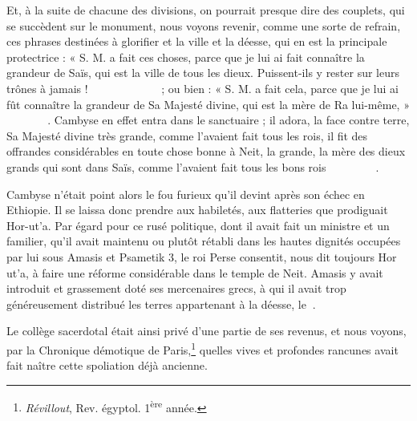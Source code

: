 \documentclass[letterpaper,twocolumn,openany,nodeprecatedcode]{dndbook}
\newcommand*\hieroAAAH{}
\newcommand*\hieroAAAO{}
\newcommand*\hieroAAAW{\raisebox{0.5ex}{}}
\newcommand*\hieroAAAX{}
\newcommand*\hieroAABC{\raisebox{0.5ex}{}}
\newcommand*\hieroAABR{}
\newcommand*\hieroAACB{\raisebox{0.5ex}{}}
\newcommand*\hieroAACM{}
\newcommand*\hieroAACN{\raisebox{1ex}{}}
\newcommand*\hieroAACS{}
\newcommand*\hieroAACW{}
\newcommand*\hieroAADS{}
\newcommand*\hieroAAEC{}
\newcommand*\hieroAAEK{}
\newcommand*\hieroAAFH{}
\newcommand*\hieroAAFN{\raisebox{0.5ex}{}}
\newcommand*\hieroAAHC{}
\newcommand*\hieroAAHW{}
\newcommand*\hieroAAHZ{}
\newcommand*\hieroAAIA{\raisebox{0.3ex}{}}
\newcommand*\hieroAAIF{}
\newcommand*\hieroAAIS{}
\newcommand*\hieroAAKE{}
\newcommand*\hieroAAKO{}
\newcommand*\hieroAAKT{}
\newcommand*\hieroAAKY{}
\newcommand*\hieroAALP{}
\newcommand*\hieroAARU{}
\newcommand*\hieroAAWO{}
\newcommand*\hieroAAYI{\raisebox{0.5ex}{}}
\newcommand*\hieroABAV{}
\newcommand*\hieroABBP{}
\newcommand*\hieroABBQ{}
\newcommand*\hieroABBR{\raisebox{0.5ex}{}}
\newcommand*\hieroABBS{}
\newcommand*\hieroABBT{}
\newcommand*\hieroABBU{\raisebox{0.3ex}{}}
\newcommand*\hieroABBV{}
\newcommand*\hieroABBW{}
\newcommand*\hieroABBX{}
\newcommand*\hieroABBY{}
\newcommand*\hieroABBZ{}
\newcommand*\hieroABCA{}
\newcommand*\hieroABCB{}
\newcommand*\hieroABCC{}
\newcommand*\hieroABCD{}
\newcommand*\hieroABCE{}
\begin{document}
Et, à la suite de chacune des divisions, on pourrait presque dire des couplets, qui se succèdent sur le monument, nous voyons revenir, comme une sorte de refrain, ces phrases destinées à glorifier et la ville et la déesse, qui en est la principale protectrice : « S. M. a fait ces choses, parce que je lui ai fait connaître la grandeur de Saïs, qui est la ville de tous les dieux. Puissent-ils y rester sur leurs trônes à jamais ! $\hieroAAKT\:\hieroAALP\:\hieroAAFN\allowbreak\:\hieroABBP\:\hieroABBP\:\hieroAAEC\allowbreak\:\hieroABBQ\:\hieroAAKE\:\hieroABBR\allowbreak\:\hieroABBS\:\hieroABAV\:\hieroAACW\allowbreak\:\hieroAAAW\:\hieroABBT\:\hieroAAHZ\allowbreak\:\hieroAAIA\:\hieroAAEK\:\hieroAAEK\:\hieroAAEK\allowbreak\:\hieroAABC\:\hieroAAFH\:\hieroABBU\allowbreak\:\hieroABBV\:\hieroAAAH\:\hieroAABR\allowbreak\:\hieroAAFN\:\hieroAAWO$ ; ou bien : « S. M. a fait cela, parce que je lui ai fût connaître la grandeur de Sa Majesté divine, qui est la mère de Ra lui-même, » $\hieroAAKT\:\hieroABBW\:\hieroABBP\allowbreak\:\hieroABBP\:\hieroAAYI\:\hieroABBQ\allowbreak\:\hieroABBX\:\hieroABBY\:\hieroABBZ\allowbreak\:\hieroAAHC\:\hieroAACS\:\hieroABCA\allowbreak\:\hieroAAKO\:\hieroAAHZ\:\hieroAAIA\allowbreak\:\hieroAAIF\:\hieroABCB$. Cambyse en effet entra dans le sanctuaire ; il adora, la face contre terre, Sa Majesté divine très grande, comme l'avaient fait tous les rois, il fit des offrandes considérables en toute chose bonne à Neit, la grande, la mère des dieux grands qui sont dans Saïs, comme l'avaient fait tous les bons rois $\hieroAACN\:\hieroAAAO\:\hieroAARU\allowbreak\:\hieroAAEK\:\hieroAACB\:\hieroAAKO\allowbreak\:\hieroAAEK\:\hieroAAEK\:\hieroAAEK\allowbreak\:\hieroAAKY\:\hieroAAHW\:\hieroAACM\allowbreak\:\hieroABCC\:\hieroAAAW\:\hieroAAIS\allowbreak\:\hieroAAKT\:\hieroAAAX\allowbreak\:\hieroABCD\:\hieroABCE$.

Cambyse n'était point alors le fou furieux qu'il devint après son échec en Ethiopie. Il se laissa donc prendre aux habiletés, aux flatteries que prodiguait Hor-ut'a. Par égard pour ce rusé politique, dont il avait fait un ministre et un familier, qu'il avait maintenu ou plutôt rétabli dans les hautes dignités occupées par lui sous Amasis et Psametik 3, le roi Perse consentit, nous dit toujours Hor ut'a, à faire une réforme considérable dans le temple de Neit. Amasis y avait introduit et grassement doté ses mercenaires grecs, à qui il avait trop généreusement distribué les terres appartenant à la déesse, le $\hieroAAEK\:\hieroAADS$.

Le collège sacerdotal était ainsi privé d'une partie de ses revenus, et nous voyons, par la Chronique démotique de Paris,\footnote{\emph{Révillout}, Rev. égyptol. 1\textsuperscript{ère} année.} quelles vives et profondes rancunes avait fait naître cette spoliation déjà ancienne.
\end{document}
